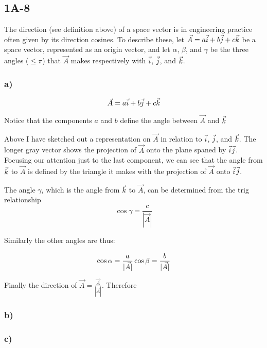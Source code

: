 \documentclass[main.tex]{subfiles}
\begin{document}
\subsection*{1A-8}

The direction (see definition above) of a space vector is in
engineering practice often given by its direction cosines. To
describe these, let $\vec{A} = a\vec{i} + b\vec{j} + c\vec{k}$ be a space
vector, represented as an origin vector, and let $\alpha$, $\beta$,
and $\gamma$ be the three angles ($\leq\pi$) that $\vec{A}$ makes
respectively with $\vec{i}$, $\vec{j}$, and $\vec{k}$.

\subsubsection*{a)}

\begin{equation*}
\vec{A} = a\vec{i} + b\vec{j} +c\vec{k}
\end{equation*}

Notice that the components $a$ and $b$ define the angle between $\vec
{A}$ and $\vec{k}$

Above I have sketched out a representation on $\vec{A}$ in relation
to {\color{i}$\vec{i}$}, {\color{j}$\vec{j}$}, and {\color{k}$\vec{k}$}.
The longer gray vector shows the projection of $\vec{A}$ onto the
plane spaned by {\color{i}$\vec{i}$}{\color{j}$\vec{j}$}.
Focusing our attention just to the last component, we can see that
the angle from {\color{k}$\vec{k}$} to $\vec{A}$
is defined by the triangle it makes with the projection of $\vec{A}$
onto {\color{i}$\vec{i}$}{\color{j}$\vec{j}$}.

The angle $\gamma$, which is the angle from {\color{k}$\vec{k}$} to $\vec{A}$,
can be determined from the trig relationship
\begin{equation*}
\cos{\gamma} = \frac{c}{|\vec{A}|}
\end{equation*}

Similarly the other angles are thus:

\begin{equation*}
\cos{\alpha} = \frac{a}{|\vec{A}|}\\
\cos{\beta} = \frac{b}{|\vec{A}|}
\end{equation*}

Finally the direction of $\vec{A} = \frac{\vec{A}}{|\vec{A}|}$.
Therefore

\subsubsection*{b)}

\subsubsection*{c)}
\end{document}

